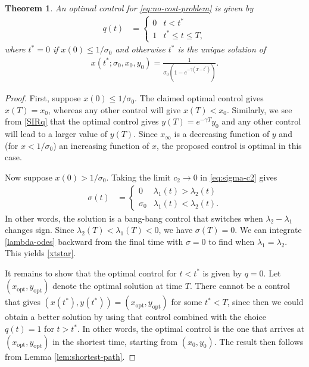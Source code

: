 \documentclass[english,12pt]{article}
\newtheorem{thm}{Theorem}
\newcommand{\Rnot}{\sigma_0}
\newcommand{\Sinf}{x_\infty}
\newcommand{\xopt}{x_\text{opt}}
\newcommand{\yopt}{y_\text{opt}}
\begin{document}
\begin{thm}
An optimal control for \eqref{eq:no-cost-problem} is given by
\begin{align}
    q(t) & = \begin{cases}  
        0 & t<t^* \\
        1 & t^* \le  t \le T,
    \end{cases}
\end{align}
where $t^*=0$ if $x(0)\le1/\sigma_0$ and otherwise $t^*$ is the unique solution of
\begin{align} \label{xtstar}
    x(t^*;\Rnot,x_0,y_0) = \frac{1}{\sigma_0(1-e^{-\gamma(T-t^*)})}.
\end{align}
\end{thm}
\begin{proof}
First, suppose $x(0)\le1/\sigma_0$.  The claimed optimal control gives $x(T)=x_0$, whereas
any other control will give $x(T)<x_0$.  Similarly, we see from \eqref{SIRq} that
the optimal control gives $y(T)=e^{-\gamma T}y_0$ and any other control will
lead to a larger value of $y(T)$.  Since $\Sinf$ is a decreasing function of $y$ and
(for $x<1/\Rnot$) an increasing function of $x$, the proposed control is optimal in this case.

Now suppose $x(0)>1/\sigma_0$.  Taking the limit $c_2\to 0$ in \eqref{eq:sigma-c2} gives
\begin{align}
    \sigma(t) & = \begin{cases} 0 & \lambda_1(t)>\lambda_2(t) \\ \sigma_0 & \lambda_1(t) < \lambda_2(t). \end{cases}
\end{align}
In other words, the solution is a bang-bang control that switches when $\lambda_2-\lambda_1$ changes sign.
Since $\lambda_2(T)<\lambda_1(T)<0$, we have $\sigma(T)=0$.  We can integrate \eqref{lambda-odes} backward from the final
time with $\sigma=0$ to find when $\lambda_1=\lambda_2$.  This yields \eqref{xtstar}.

It remains to show that the optimal control for $t<t^*$ is given by $q=0$.  
Let $(\xopt,\yopt)$ denote the optimal solution at time $T$.  There cannot be a
control that gives $(x(t^*),y(t^*)) = (\xopt,\yopt)$ for some $t^*<T$, since then
we could obtain a better solution by using that control combined with the choice
$q(t)=1$ for $t>t^*$.  In other words,
the optimal control is the one that arrives at $(\xopt,\yopt)$ in the shortest time,
starting from $(x_0,y_0)$.  The result then follows from Lemma \ref{lem:shortest-path}.
\end{proof}
\end{document}
